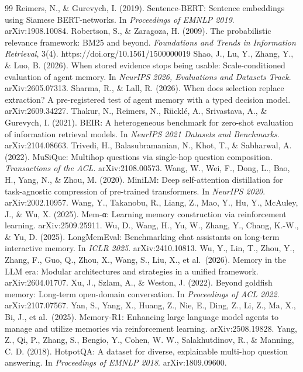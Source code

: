 \documentclass[a4paper,fleqn]{cas-sc}
\begin{document}
\begin{thebibliography}{99}
\bibitem{} Reimers, N., \& Gurevych, I. (2019). Sentence-BERT: Sentence embeddings using Siamese BERT-networks. In \emph{Proceedings of EMNLP 2019}. arXiv:1908.10084.
\bibitem{} Robertson, S., \& Zaragoza, H. (2009). The probabilistic relevance framework: BM25 and beyond. \emph{Foundations and Trends in Information Retrieval}, 3(4). https://doi.org/10.1561/1500000019
\bibitem{} Shao, J., Lu, Y., Zhang, Y., \& Luo, B. (2026). When stored evidence stops being usable: Scale-conditioned evaluation of agent memory. In \emph{NeurIPS 2026, Evaluations and Datasets Track}. arXiv:2605.07313.
\bibitem{} Sharma, R., \& Lall, R. (2026). When does selection replace extraction? A pre-registered test of agent memory with a typed decision model. arXiv:2609.34227.
\bibitem{} Thakur, N., Reimers, N., Rücklé, A., Srivastava, A., \& Gurevych, I. (2021). BEIR: A heterogeneous benchmark for zero-shot evaluation of information retrieval models. In \emph{NeurIPS 2021 Datasets and Benchmarks}. arXiv:2104.08663.
\bibitem{} Trivedi, H., Balasubramanian, N., Khot, T., \& Sabharwal, A. (2022). MuSiQue: Multihop questions via single-hop question composition. \emph{Transactions of the ACL}. arXiv:2108.00573.
\bibitem{} Wang, W., Wei, F., Dong, L., Bao, H., Yang, N., \& Zhou, M. (2020). MiniLM: Deep self-attention distillation for task-agnostic compression of pre-trained transformers. In \emph{NeurIPS 2020}. arXiv:2002.10957.
\bibitem{} Wang, Y., Takanobu, R., Liang, Z., Mao, Y., Hu, Y., McAuley, J., \& Wu, X. (2025). Mem-α: Learning memory construction via reinforcement learning. arXiv:2509.25911.
\bibitem{} Wu, D., Wang, H., Yu, W., Zhang, Y., Chang, K.-W., \& Yu, D. (2025). LongMemEval: Benchmarking chat assistants on long-term interactive memory. In \emph{ICLR 2025}. arXiv:2410.10813.
\bibitem{} Wu, Y., Lin, T., Zhou, Y., Zhang, F., Guo, Q., Zhou, X., Wang, S., Liu, X., et al.~(2026). Memory in the LLM era: Modular architectures and strategies in a unified framework. arXiv:2604.01707.
\bibitem{} Xu, J., Szlam, A., \& Weston, J. (2022). Beyond goldfish memory: Long-term open-domain conversation. In \emph{Proceedings of ACL 2022}. arXiv:2107.07567.
\bibitem{} Yan, S., Yang, X., Huang, Z., Nie, E., Ding, Z., Li, Z., Ma, X., Bi, J., et al.~(2025). Memory-R1: Enhancing large language model agents to manage and utilize memories via reinforcement learning. arXiv:2508.19828.
\bibitem{} Yang, Z., Qi, P., Zhang, S., Bengio, Y., Cohen, W. W., Salakhutdinov, R., \& Manning, C. D. (2018). HotpotQA: A dataset for diverse, explainable multi-hop question answering. In \emph{Proceedings of EMNLP 2018}. arXiv:1809.09600.

\end{thebibliography}
\end{document}
